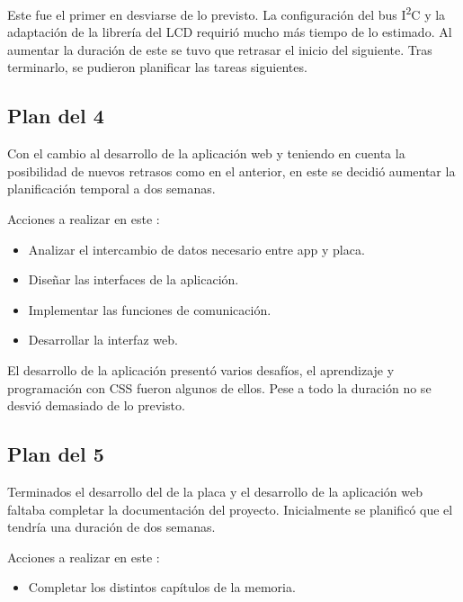 Este fue el primer  en desviarse de lo previsto. 
La configuración del bus I\textsuperscript{2}C y la adaptación de la librería
del LCD requirió mucho más tiempo de lo estimado. Al aumentar la duración
de este  se tuvo que retrasar el inicio del siguiente.
Tras terminarlo, se pudieron planificar las tareas siguientes.

\clearpage

\subsection{Plan del  4} \label{sec:plan-s4}
Con el cambio al desarrollo de la aplicación web y teniendo en cuenta la
posibilidad de nuevos retrasos como en el  anterior,
en este se decidió aumentar la planificación temporal a dos semanas.

Acciones a realizar en este :
\begin{itemize}
  \item Analizar el intercambio de datos necesario entre app y placa.
  \item Diseñar las interfaces de la aplicación. 
  \item Implementar las funciones de comunicación.
  \item Desarrollar la interfaz web.
\end{itemize}


El desarrollo de la aplicación presentó varios desafíos, el aprendizaje y 
programación con CSS fueron algunos de ellos. Pese a todo la duración no 
se desvió demasiado de lo previsto.

\clearpage

\subsection{Plan del  5} \label{sec:plan-s5}
Terminados el desarrollo del  de la placa y 
el desarrollo de la aplicación web faltaba completar la documentación del 
proyecto. Inicialmente se planificó que el 
tendría una duración de dos semanas.

Acciones a realizar en este :
\begin{itemize}
  \item Completar los distintos capítulos de la memoria.
\end{itemize}

